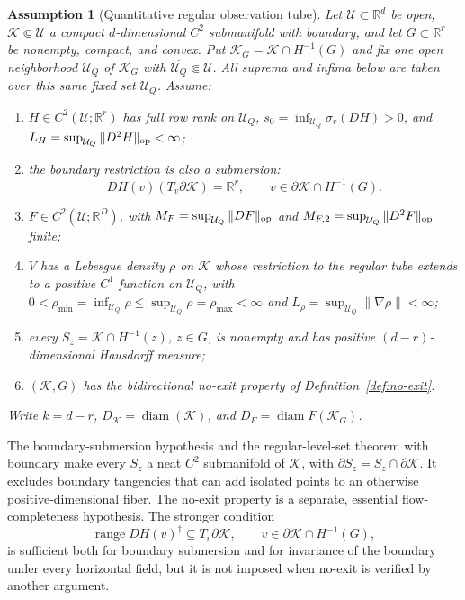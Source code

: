 \documentclass[11pt]{article}
\newtheorem{assumption}[theorem]{Assumption}
\theoremstyle{definition}
\newcommand{\R}{\mathbb R}
\begin{document}
\begin{assumption}[Quantitative regular observation tube]\label{ass:Q}
Let $\mathcal U\subset\R^d$ be open, $\mathcal K\Subset\mathcal U$ a compact
$d$-dimensional $C^2$ submanifold with boundary, and let
$G\subset\R^r$ be nonempty, compact, and convex.
Put $\mathcal K_G=\mathcal K\cap H^{-1}(G)$ and fix one open neighborhood
$\mathcal U_Q$ of $\mathcal K_G$ with
$\overline{\mathcal U_Q}\Subset\mathcal U$.  All suprema and infima below are
taken over this same fixed set $\mathcal U_Q$.  Assume:
\begin{enumerate}
 \item $H\in C^2(\mathcal U;\R^r)$ has full row rank on $\mathcal U_Q$,
 $s_0=\inf_{\mathcal U_Q}\sigma_r(DH)>0$, and
 $L_H=\sup_{\mathcal U_Q}\|D^2H\|_{\rm op}<\infty$;
 \item the boundary restriction is also a submersion:
 \[
   DH(v)(T_v\partial\mathcal K)=\R^r,
   \qquad v\in\partial\mathcal K\cap H^{-1}(G).
 \]
 \item $F\in C^2(\mathcal U;\R^D)$, with
 $M_F=\sup_{\mathcal U_Q}\|DF\|_{\rm op}$ and
 $M_{F,2}=\sup_{\mathcal U_Q}\|D^2F\|_{\rm op}$ finite;
 \item $V$ has a Lebesgue density $\rho$ on $\mathcal K$ whose restriction to
 the regular tube extends to a positive $C^1$ function on $\mathcal U_Q$, with
 $0<\rho_{\min}=\inf_{\mathcal U_Q}\rho\le
 \sup_{\mathcal U_Q}\rho=\rho_{\max}<\infty$ and
 $L_\rho=\sup_{\mathcal U_Q}\|\nabla\rho\|<\infty$;
 \item every $S_z=\mathcal K\cap H^{-1}(z)$, $z\in G$, is nonempty and has
 positive $(d-r)$-dimensional Hausdorff measure;
 \item $(\mathcal K,G)$ has the bidirectional no-exit property of
 Definition~\ref{def:no-exit}.
\end{enumerate}
Write $k=d-r$, $D_{\mathcal K}=\operatorname{diam}(\mathcal K)$, and
$D_F=\operatorname{diam}F(\mathcal K_G)$.
\end{assumption}

The boundary-submersion hypothesis and the regular-level-set theorem with
boundary make every $S_z$ a neat $C^2$ submanifold of $\mathcal K$, with
$\partial S_z=S_z\cap\partial\mathcal K$.  It excludes boundary tangencies that
can add isolated points to an otherwise positive-dimensional fiber.  The
no-exit property is a separate, essential flow-completeness hypothesis.  The
stronger condition
\[
 \operatorname{range}DH(v)^\dagger\subseteq T_v\partial\mathcal K,
 \qquad v\in\partial\mathcal K\cap H^{-1}(G),
\]
is sufficient both for boundary submersion and for invariance of the boundary
under every horizontal field, but it is not imposed when no-exit is verified
by another argument.
\end{document}
